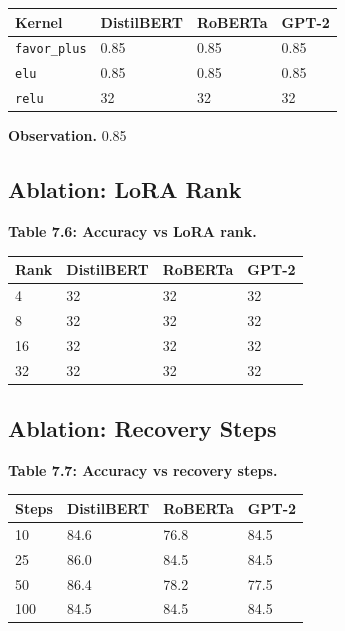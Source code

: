 \begin{table}[H]
\centering
\small
\begin{tabular}{llll}
\toprule
\textbf{Kernel} & \textbf{DistilBERT} & \textbf{RoBERTa} & \textbf{GPT-2} \\
\midrule
\texttt{favor\_plus} & 0.85 & 0.85 & 0.85 \\
\texttt{elu} & 0.85 & 0.85 & 0.85 \\
\texttt{relu} & 32 & 32 & 32 \\
\bottomrule
\end{tabular}
\end{table}

\textbf{Observation.} 0.85

\subsection{Ablation: LoRA Rank}

\textbf{Table 7.6: Accuracy vs LoRA rank.}

\begin{table}[H]
\centering
\small
\begin{tabular}{llll}
\toprule
\textbf{Rank} & \textbf{DistilBERT} & \textbf{RoBERTa} & \textbf{GPT-2} \\
\midrule
4 & 32 & 32 & 32 \\
8 & 32 & 32 & 32 \\
16 & 32 & 32 & 32 \\
32 & 32 & 32 & 32 \\
\bottomrule
\end{tabular}
\end{table}

\subsection{Ablation: Recovery Steps}

\textbf{Table 7.7: Accuracy vs recovery steps.}

\begin{table}[H]
\centering
\small
\begin{tabular}{llll}
\toprule
\textbf{Steps} & \textbf{DistilBERT} & \textbf{RoBERTa} & \textbf{GPT-2} \\
\midrule
10 & 84.6 & 76.8 & 84.5 \\
25 & 86.0 & 84.5 & 84.5 \\
50 & 86.4 & 78.2 & 77.5 \\
100 & 84.5 & 84.5 & 84.5 \\
\bottomrule
\end{tabular}
\end{table}

